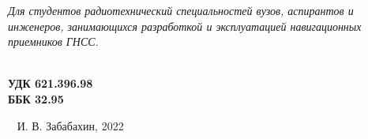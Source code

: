 \vspace{1ex}
\noindent
\hfill
\begin{minipage}{0.94\textwidth}
\small{
\textit{
Для студентов радиотехнический специальностей вузов, аспирантов и инженеров, занимающихся разработкой и эксплуатацией навигационных приемников ГНСС.
}
}
\end{minipage}


\hfill
\begin{minipage}{0.3\textwidth}
  \textbf{ \\
  УДК 621.396.98 \\ %
  ББК 32.95
  }
\end{minipage}

\vfill

\begin{flushright}
\textcopyright~ И. В. Забабахин, 2022
\end{flushright}

\setcounter{page}{2}

